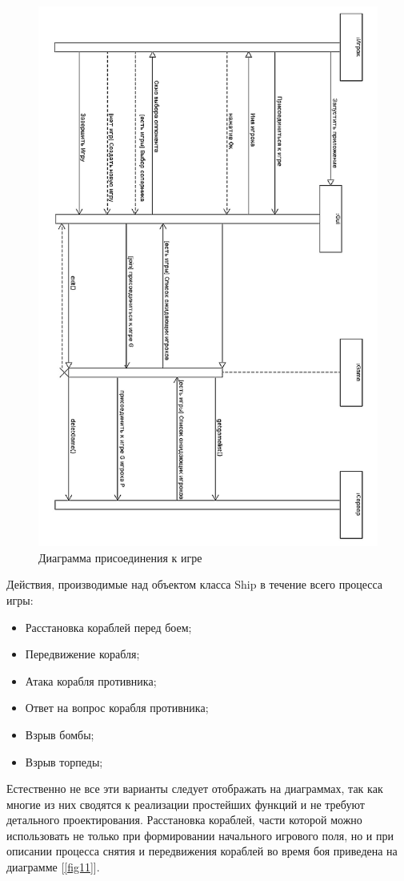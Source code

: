 \begin{figure}[pt]
\centering
\includegraphics[width=15cm]{images/JG.png}
\caption{Диаграмма присоединения к игре}
\label{fig10}
\end{figure}

Действия, производимые над объектом класса Ship в течение всего процесса игры:
	\begin{itemize}
		\item Расстановка кораблей перед боем;
		\item Передвижение корабля;
		\item Атака корабля противника;
		\item Ответ на вопрос корабля противника;
		\item Взрыв бомбы;
		\item Взрыв торпеды;
  	\end{itemize} 
Естественно не все эти варианты следует отображать на диаграммах, так как многие из них сводятся к реализации простейших функций и не требуют детального проектирования. 
Расстановка кораблей, части которой можно использовать не только при формировании начального игрового поля, но и при описании процесса снятия и передвижения кораблей во время боя  приведена на диаграмме [\ref{fig11}].

